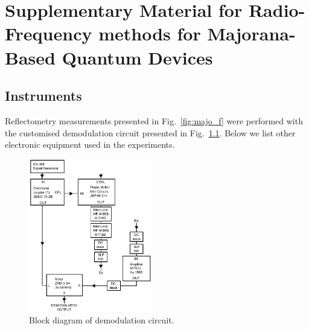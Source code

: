 \chapter{Supplementary Material for Radio-Frequency methods for Majorana-Based Quantum Devices}

\section{Instruments}
\label{sec:majo_B}

Reflectometry measurements presented in Fig.~\ref{fig:majo_f} were performed with the customised demodulation circuit presented in Fig.~\ref{fig:majo_g}. Below we list other electronic equipment used in the experiments.

\begin{figure}
    \includegraphics[width=0.48\textwidth]{Fig7-0.pdf}
      \caption[Block diagram of demodulation circuit]{Block diagram of demodulation circuit.}
      \label{fig:majo_g}
\end{figure}

